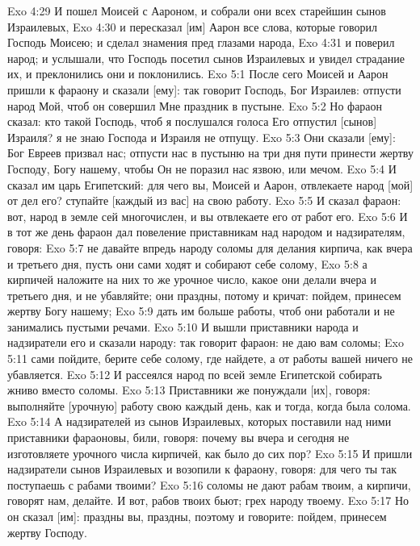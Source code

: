 \vs Exo 4:29 И пошел Моисей с Аароном, и собрали они всех старейшин сынов Израилевых,
\vs Exo 4:30 и пересказал [им] Аарон все слова, которые говорил Господь Моисею; и сделал  знамения пред глазами народа,
\vs Exo 4:31 и поверил народ; и услышали, что Господь посетил сынов Израилевых и увидел страдание их, и преклонились они и поклонились.
\vs Exo 5:1 После сего Моисей и Аарон пришли к фараону и сказали [ему]: так говорит Господь, Бог Израилев: отпусти народ Мой, чтоб он совершил Мне праздник в пустыне.
\vs Exo 5:2 Но фараон сказал: кто такой Господь, чтоб я послушался голоса Его  отпустил [сынов] Израиля? я не знаю Господа и Израиля не отпущу.
\vs Exo 5:3 Они сказали [ему]: Бог Евреев призвал нас; отпусти нас в пустыню на три дня пути принести жертву Господу, Богу нашему, чтобы Он не поразил нас язвою, или мечом.
\vs Exo 5:4 И сказал им царь Египетский: для чего вы, Моисей и Аарон, отвлекаете народ [мой] от дел его? ступайте [каждый из вас] на свою работу.
\vs Exo 5:5 И сказал фараон: вот, народ в земле сей многочислен, и вы отвлекаете его от работ его.
\rsbpar\vs Exo 5:6 И в тот же день фараон дал повеление приставникам над народом и надзирателям, говоря:
\vs Exo 5:7 не давайте впредь народу соломы для делания кирпича, как вчера и третьего дня, пусть они сами ходят и собирают себе солому,
\vs Exo 5:8 а кирпичей наложите на них то же урочное число, какое они делали вчера и третьего дня, и не убавляйте; они праздны, потому и кричат: пойдем, принесем жертву Богу нашему;
\vs Exo 5:9 дать им больше работы, чтоб они работали и не занимались пустыми речами.
\vs Exo 5:10 И вышли приставники народа и надзиратели его и сказали народу: так говорит фараон: не даю вам соломы;
\vs Exo 5:11 сами пойдите, берите себе солому, где найдете, а от работы вашей ничего не убавляется.
\vs Exo 5:12 И рассеялся народ по всей земле Египетской собирать жниво вместо соломы.
\vs Exo 5:13 Приставники же понуждали [их], говоря: выполняйте [урочную] работу свою каждый день, как и тогда, когда была  солома.
\vs Exo 5:14 А надзирателей из сынов Израилевых, которых поставили над ними приставники фараоновы, били, говоря: почему вы вчера и сегодня не изготовляете урочного числа кирпичей, как было до сих пор?
\vs Exo 5:15 И пришли надзиратели сынов Израилевых и возопили к фараону, говоря: для чего ты так поступаешь с рабами твоими?
\vs Exo 5:16 соломы не дают рабам твоим, а кирпичи, говорят нам, делайте. И вот, рабов твоих бьют; грех народу твоему.
\vs Exo 5:17 Но он сказал [им]: праздны вы, праздны, поэтому и говорите: пойдем, принесем жертву Господу.
